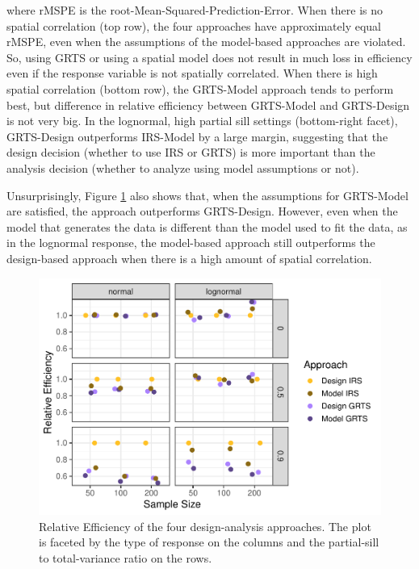 \documentclass[]{elsarticle} %
\begin{document}
where rMSPE is the root-Mean-Squared-Prediction-Error. When there is no
spatial correlation (top row), the four approaches have approximately
equal rMSPE, even when the assumptions of the model-based approaches are
violated. So, using GRTS or using a spatial model does not result in
much loss in efficiency even if the response variable is not spatially
correlated. When there is high spatial correlation (bottom row), the
GRTS-Model approach tends to perform best, but difference in relative
efficiency between GRTS-Model and GRTS-Design is not very big. In the
lognormal, high partial sill settings (bottom-right facet), GRTS-Design
outperforms IRS-Model by a large margin, suggesting that the design
decision (whether to use IRS or GRTS) is more important than the
analysis decision (whether to analyze using model assumptions or not).

Unsurprisingly, Figure \ref{fig:figeff} also shows that, when the
assumptions for GRTS-Model are satisfied, the approach outperforms
GRTS-Design. However, even when the model that generates the data is
different than the model used to fit the data, as in the lognormal
response, the model-based approach still outperforms the design-based
approach when there is a high amount of spatial correlation.

\begin{figure}
\includegraphics[width=1\linewidth]{manuscript_files/figure-latex/figeff-1} \caption{Relative Efficiency of the four design-analysis approaches. The plot is faceted by the type of response on the columns and the partial-sill to total-variance ratio on the rows.}\label{fig:figeff}
\end{figure}
\end{document}
